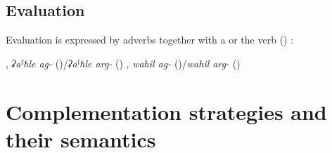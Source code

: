 
\subsection{Evaluation}
\label{ssec:Evaluation}

Evaluation is expressed by adverbs together with a  or the verb  () :
%
\begin{exe}
	\ex	\label{ex:evaluation verbs}
	\begin{xlist}
		\ex	{}, \textit{ʡaˁħle ag-} ()\slash\textit{ʡaˁħle arg-} () 
		\ex	{}, \textit{wahil ag-} ()\slash\textit{wahil arg-} () 
	\end{xlist}
\end{exe}



\section{Complementation strategies and their semantics}
\label{sec:Complementation strategies and their semantics}

